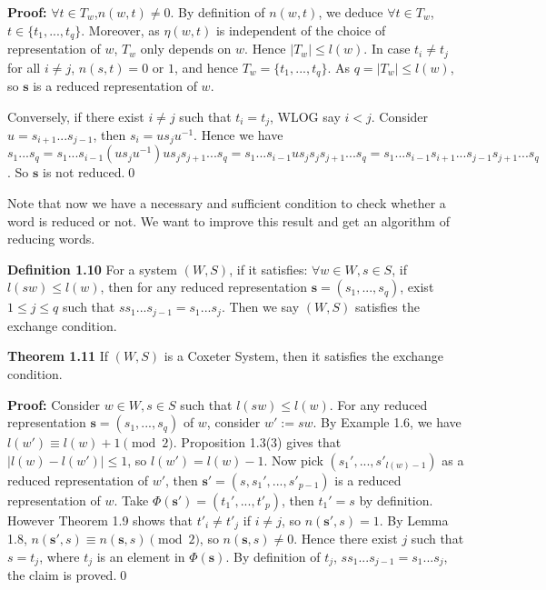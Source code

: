 \documentclass[../main.tex]{subfiles}
\begin{document}
\vspace{0.5\baselineskip} 
\noindent \textbf{Proof:} $\forall t \in T_w$,$n(w,t)\ne0$. By definition of $n(w,t)$, we deduce $\forall t \in T_w$,$t\in\{t_1,...,t_q\}$. Moreover, as $\eta(w,t)$ is independent of the choice of representation of $w$, $T_w$ only depends on $w$. Hence $|T_w|\le l(w)$. In case $t_i \ne t_j$ for all $i\ne j$, $n(s,t)=0$ or $1$, and hence $T_w=\{t_1,...,t_q\}$. As $q=|T_w| \le l(w)$, so $\mathbf{s}$ is a reduced representation of $w$. 

Conversely, if there exist $i \ne j$ such that $t_i=t_j$, WLOG say $i < j$. Consider $u=s_{i+1}...s_{j-1}$, then $s_i=us_ju^{-1}$. Hence we have $s_1...s_q=s_1...s_{i-1}(us_ju^{-1})us_js_{j+1}...s_q=s_1...s_{i-1}us_js_js_{j+1}...s_q=s_1...s_{i-1}s_{i+1}...s_{j-1}s_{j+1}...s_q$. So $\mathbf{s}$ is not reduced.\qed

\vspace{\baselineskip}
Note that now we have a necessary and sufficient condition to check whether a word is reduced or not. We want to improve this result and get an algorithm of reducing words. 

\vspace{\baselineskip}
\noindent \textbf{Definition 1.10} For a system $(W,S)$, if it satisfies: $\forall w \in W,s\in S$, if $l(sw) \le l(w)$, then for any reduced representation $\mathbf{s}=(s_1,...,s_q)$, exist $1\le j \le q$ such that $ss_1...s_{j-1}=s_1...s_j$. Then we say $(W,S)$ satisfies the exchange condition.

\vspace{\baselineskip}
\noindent \textbf{Theorem 1.11} If $(W,S)$ is a Coxeter System, then it satisfies the exchange condition. 

\vspace{0.5\baselineskip}
\noindent \textbf{Proof:} Consider $w\in W,s \in S$ such that $l(sw) \le l(w)$. For any reduced representation $\mathbf{s}=(s_1,...,s_q)$ of $w$, consider $w':=sw$. By Example 1.6, we have $l(w') \equiv l(w)+1\pmod{2}$. Proposition 1.3(3) gives that $|l(w)-l(w')|\le1$, so $l(w')=l(w)-1$. Now pick $(s_1',...,s'_{l(w)-1})$ as a reduced representation of $w'$, then $\mathbf{s'}=(s,s_1',...,s'_{p-1})$ is a reduced representation of $w$. Take $\Phi(\mathbf{s'})=(t_1',...,t'_p)$, then $t_1'=s$ by definition. However Theorem 1.9 shows that $t'_i \ne t'_j$ if $i\ne j$, so $n(\mathbf{s'},s)=1$. By Lemma 1.8, $n(\mathbf{s'},s) \equiv n(\mathbf{s},s)\pmod{2}$, so $n(\mathbf{s},s) \ne 0$. Hence there exist $j$ such that $s=t_j$, where $t_j$ is an element in $\Phi(\mathbf{s})$. By definition of $t_j$, $ss_1...s_{j-1}=s_1...s_j$, the claim is proved.\qed
\end{document}
